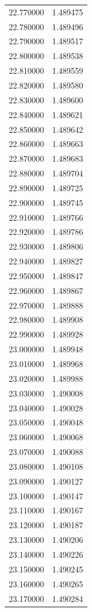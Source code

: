 \begin{tabular}{rr}
22.770000 & 1.489475 \\
22.780000 & 1.489496 \\
22.790000 & 1.489517 \\
22.800000 & 1.489538 \\
22.810000 & 1.489559 \\
22.820000 & 1.489580 \\
22.830000 & 1.489600 \\
22.840000 & 1.489621 \\
22.850000 & 1.489642 \\
22.860000 & 1.489663 \\
22.870000 & 1.489683 \\
22.880000 & 1.489704 \\
22.890000 & 1.489725 \\
22.900000 & 1.489745 \\
22.910000 & 1.489766 \\
22.920000 & 1.489786 \\
22.930000 & 1.489806 \\
22.940000 & 1.489827 \\
22.950000 & 1.489847 \\
22.960000 & 1.489867 \\
22.970000 & 1.489888 \\
22.980000 & 1.489908 \\
22.990000 & 1.489928 \\
23.000000 & 1.489948 \\
23.010000 & 1.489968 \\
23.020000 & 1.489988 \\
23.030000 & 1.490008 \\
23.040000 & 1.490028 \\
23.050000 & 1.490048 \\
23.060000 & 1.490068 \\
23.070000 & 1.490088 \\
23.080000 & 1.490108 \\
23.090000 & 1.490127 \\
23.100000 & 1.490147 \\
23.110000 & 1.490167 \\
23.120000 & 1.490187 \\
23.130000 & 1.490206 \\
23.140000 & 1.490226 \\
23.150000 & 1.490245 \\
23.160000 & 1.490265 \\
23.170000 & 1.490284 \\

\end{tabular}
